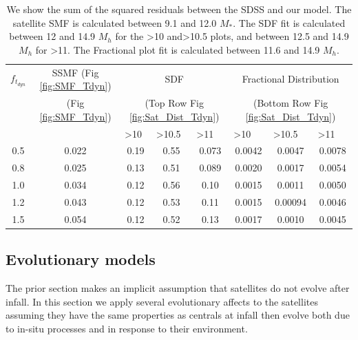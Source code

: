 \begin{table}
\centering
\caption{We show the sum of the squared residuals between the SDSS and our model. The satellite SMF is calculated between 9.1 and 12.0 $M_{*}$. The SDF fit is calculated between 12 and 14.9 $M_h$ for the \textgreater10 and\textgreater10.5 plots, and between 12.5 and 14.9 $M_h$ for \textgreater11. The Fractional plot fit is calculated between 11.6 and 14.9 $M_h$.}
\label{tab:bestfit}
\begin{tabular}{c|c|ccc|ccc}
$f_{t_{dyn}}$   & SSMF   (Fig \ref{fig:SMF_Tdyn})               & \multicolumn{3}{c}{SDF  } \vline & \multicolumn{3}{c}{Fractional Distribution } \\
   &   (Fig \ref{fig:SMF_Tdyn})               & \multicolumn{3}{c}{ (Top Row Fig \ref{fig:Sat_Dist_Tdyn}) } \vline & \multicolumn{3}{c}{ (Bottom Row Fig \ref{fig:Sat_Dist_Tdyn})} \\ \hline
            \multicolumn{1}{l}{} \vline & \multicolumn{1}{l}{} \vline & \multicolumn{1}{l}{\textgreater{}10} & \multicolumn{1}{l}{\textgreater{}10.5} & \multicolumn{1}{l}{\textgreater{}11} \vline & \multicolumn{1}{l}{\textgreater{}10} & \multicolumn{1}{l}{\textgreater{}10.5} & \multicolumn{1}{l}{\textgreater{}11} \\ \hline
0.5    & 0.022   & 0.19  & 0.55    & 0.073    & 0.0042 & 0.0047 & 0.0078  \\
0.8    & 0.025   & 0.13  & 0.51    & 0.089    & 0.0020 & 0.0017 & 0.0054  \\
1.0    & 0.034   & 0.12  & 0.56    & 0.10     & 0.0015 & 0.0011 & 0.0050  \\
1.2    & 0.043   & 0.12  & 0.53    & 0.11     & 0.0015 & 0.00094& 0.0046  \\
1.5    & 0.054   & 0.12  & 0.52    & 0.13     & 0.0017 & 0.0010 & 0.0045                              
\end{tabular}
\end{table}

\subsection{Evolutionary models}

The prior section makes an implicit assumption that satellites do not evolve after infall. In this section we apply several evolutionary affects to the satellites assuming they have the same properties as centrals at infall then evolve both due to in-situ processes and in response to their environment.


